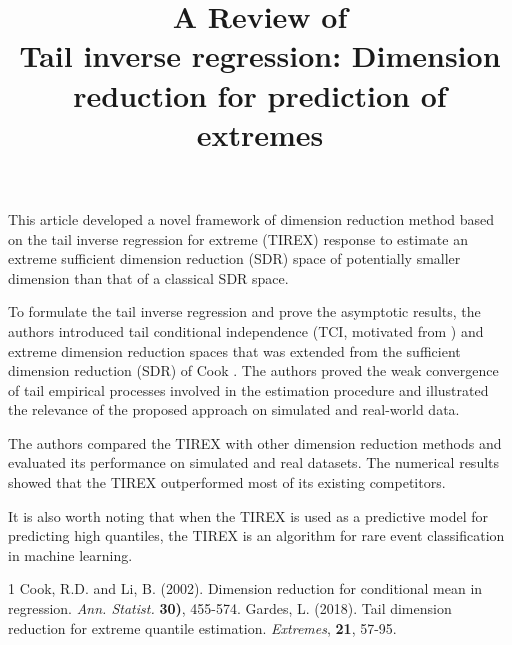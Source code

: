 \documentclass[11pt]{article}
\title{A Review of \\ Tail inverse regression: Dimension reduction for 	prediction of extremes}
\begin{document}
	\maketitle	
	
This article developed a novel framework of dimension reduction method based on the tail inverse regression for extreme (TIREX) response to estimate an extreme sufficient dimension reduction (SDR) space of potentially smaller dimension than that of a classical SDR space. 

To formulate the tail inverse regression and prove the asymptotic results, the authors introduced tail conditional independence (TCI, motivated from \cite{2}) and extreme dimension reduction spaces that was extended from the sufficient dimension reduction (SDR) of Cook \cite{1}. The authors proved the weak convergence of tail empirical processes involved in the estimation procedure and illustrated the relevance of the proposed approach on simulated and real-world data.

The authors compared the TIREX with other dimension reduction methods and evaluated its performance on simulated and real datasets. The numerical results showed that the TIREX outperformed most of its existing competitors. 

It is also worth noting that when the TIREX is used as a predictive model for predicting high quantiles, the TIREX is an algorithm for rare event classification in machine learning. 



\begin{thebibliography}{1}
	 Cook, R.D. and Li, B. (2002). Dimension reduction for conditional mean in regression. \emph{Ann. Statist.} \textbf{30)}, 455-574.
	 Gardes, L. (2018). Tail dimension reduction for extreme quantile estimation. \emph{Extremes}, \textbf{21}, 57-95.
\end{thebibliography}
	
	
	
	
\end{document}
